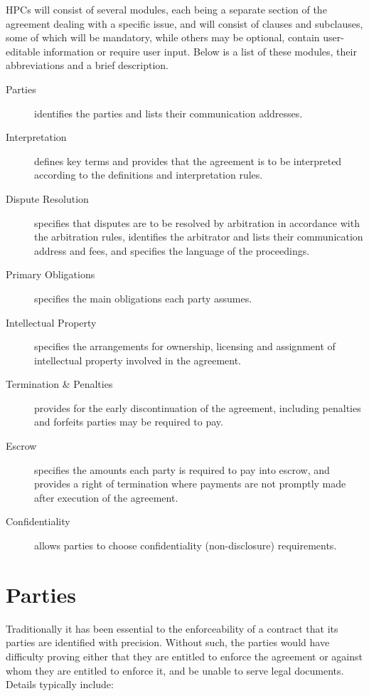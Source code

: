 \documentclass[a4paper,12pt]{article}
\begin{document}
HPCs will consist of several modules, each being a separate section of the agreement dealing with a specific issue, and will consist of clauses and subclauses, some of which will be mandatory, while others may be optional, contain user-editable information or require user input. Below is a list of these modules, their abbreviations and a brief description.

\begin{description}
	\item[Parties] identifies the parties and lists their communication addresses.
	\item[Interpretation] defines key terms and provides that the agreement is to be interpreted according to the definitions and interpretation rules.
	\item[Dispute Resolution] specifies that disputes are to be resolved by arbitration in accordance with the arbitration rules, identifies the arbitrator and lists their communication address and fees, and specifies the language of the proceedings.
	\item[Primary Obligations] specifies the main obligations each party assumes.
	\item[Intellectual Property] specifies the arrangements for ownership, licensing and assignment of intellectual property involved in the agreement.
	\item[Termination \& Penalties] provides for the early discontinuation of the agreement, including penalties and forfeits parties may be required to pay.
	\item[Escrow] specifies the amounts each party is required to pay into escrow, and provides a right of termination where payments are not promptly made after execution of the agreement.
	\item[Confidentiality] allows parties to choose confidentiality (non-disclosure) requirements.
\end{description}

\section{Parties}

Traditionally it has been essential to the enforceability of a contract that its parties are identified with precision. Without such, the parties would have difficulty proving either that they are entitled to enforce the agreement or against whom they are entitled to enforce it, and be unable to serve legal documents. Details typically include:
\end{document}
